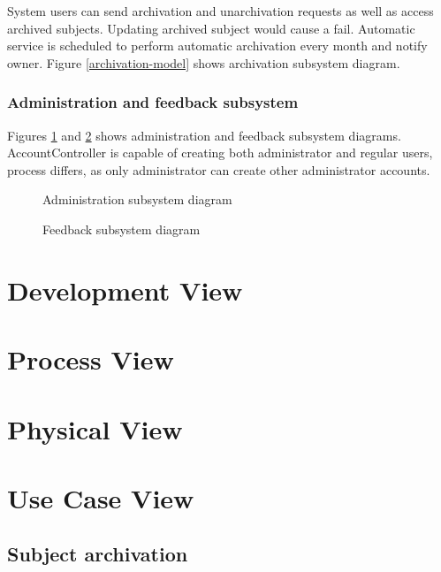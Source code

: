 \documentclass[
    english, %
]{VUMIFPSkursinis}
\begin{document}
System users can send archivation and unarchivation requests as well as access archived subjects. Updating archived subject would cause a fail. Automatic service is scheduled to perform automatic archivation every month and notify owner. Figure \ref{archivation-model} shows archivation subsystem diagram.

\subsubsection{Administration and feedback subsystem}

Figures \ref{administration-model} and \ref{feedback-model} shows administration and feedback subsystem diagrams. AccountController is capable of creating both administrator and regular users, process differs, as only administrator can create other administrator accounts.

\begin{figure}[ht]
    \centering
    
    \caption{Administration subsystem diagram}
    \label{administration-model}
\end{figure}

\begin{figure}[ht]
    \centering
    
    \caption{Feedback subsystem diagram}
    \label{feedback-model}
\end{figure}



\section{Development View}

\section{Process View}

\section{Physical View}

\section{Use Case View}

\subsection{Subject archivation}
\end{document}
